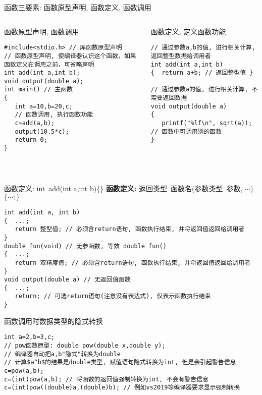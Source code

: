 \begin{frame}{函数三要素: 函数原型声明, 函数定义, 函数调用}
\vspace{-0.2cm}
\begin{columns}[T]
\begin{beamerboxesrounded}{函数原型声明, 函数调用}
\begin{lstlisting}
#include<stdio.h> // 库函数原型声明
// 函数原型声明, 使编译器认识这个函数，如果函数定义在调用之前，可省略声明
int add(int a,int b); 
void output(double a);
int main() // 主函数
{
   int a=10,b=20,c;
   // 函数调用, 执行函数功能
   c=add(a,b); 
   output(10.5*c);
   return 0; 
}
\end{lstlisting}
\end{beamerboxesrounded}
\begin{beamerboxesrounded}{函数定义, 定义函数功能}
\begin{lstlisting}
// 通过参数a,b的值, 进行相关计算, 返回整型数据给调用者
int add(int a,int b)
{  return a+b; // 返回整型值 }

// 通过参数a的值, 进行相关计算, 不需要返回数据
void output(double a)
{  
   printf("%lf\n", sqrt(a)); // 函数中可调用别的函数
}
\end{lstlisting}
\end{beamerboxesrounded}
\end{columns}
~\\
\end{frame}


\begin{frame}{函数定义: int\, add(int a,int b)\{\quad\}}
\textbf{函数定义: } 返回类型\, 函数名(参数类型\, 参数, $\cdots$) $\{\cdots ; \}$
\begin{lstlisting}
int add(int a, int b)
{  ...;
   return 整型值; // 必须含return语句, 函数执行结束, 并将返回值返回给调用者
}
double fun(void) // 无参函数, 等效 double fun() 
{  ...;
   return 双精度值; // 必须含return语句, 函数执行结束, 并将返回值返回给调用者
}
void output(double a) // 无返回值函数
{  ...;
   return; // 可选return语句(注意没有表达式), 仅表示函数执行结束
}
\end{lstlisting}
\end{frame}

\begin{frame}{函数调用时数据类型的隐式转换}
\begin{lstlisting}
int a=2,b=3,c;
// pow函数原型: double pow(double x,double y);
// 编译器自动把a,b"隐式"转换为double
// 计算$a^b$的结果是double类型, 赋值语句隐式转换为int, 但是会引起警告信息
c=pow(a,b);
c=(int)pow(a,b); // 将函数的返回值强制转换为int, 不会有警告信息
c=(int)pow((double)a,(double)b); // 例如vs2019等编译器要求显示强制转换
\end{lstlisting}
\end{frame}

